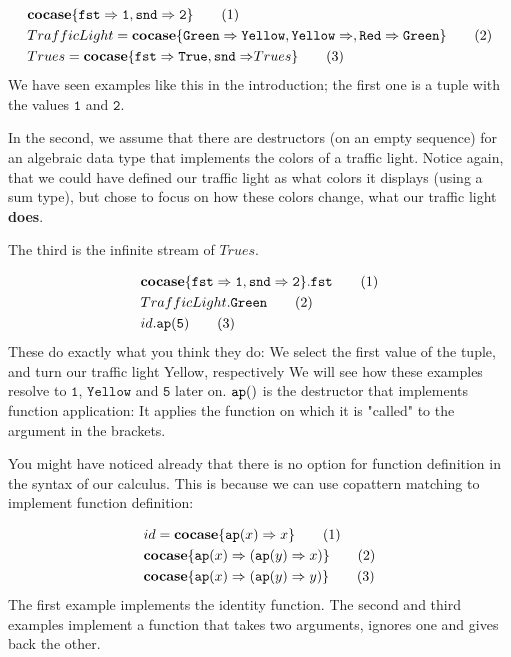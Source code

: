 \documentclass[twoside,12pt,a4paper]{article}
\begin{document}
\begin{example}
    \begin{align*}
        &\textbf{cocase}\{\mathtt{fst\Rightarrow 1, snd\Rightarrow 2}\}\tag{1}\\
        &TrafficLight = \textbf{cocase}\{\mathtt{Green \Rightarrow Yellow, Yellow\Rightarrow, Red\Rightarrow Green}\}\tag{2}\\
        &Trues = \textbf{cocase}\{\mathtt{fst \Rightarrow True, snd\Rightarrow}Trues\}\tag{3} 
    \end{align*}
    We have seen examples like this in the introduction; the first one is a tuple with the values $\mathtt{1}$ and $\mathtt{2}$.

    In the second, we assume that there are destructors (on an empty sequence) for an algebraic data type that implements the colors of a traffic light.
    Notice again, that we could have defined our traffic light as what colors it displays (using a sum type), but chose to focus on how these colors change, 
    what our traffic light \textbf{does}.

    The third is the infinite stream of $Trues$.
\end{example}

\begin{example}
    \begin{align*}
        &\textbf{cocase}\{\mathtt{fst\Rightarrow 1, snd\Rightarrow 2}\}.\mathtt{fst}\tag{1}\\
        &TrafficLight.\mathtt{Green}\tag{2}\\
        &id.\texttt{ap}(\mathtt{5})\tag{3}
    \end{align*}
    These do exactly what you think they do: We select the first value of the tuple,
    and turn our traffic light Yellow, respectively 
    We will see how these examples resolve to $\mathtt{1}$, $\mathtt{Yellow}$ and $\mathtt{5}$ later on. %
    $\texttt{ap}()$ is the destructor that implements function application: It applies the function on which it is "called" to the argument in the brackets.
\end{example} 

You might have noticed already that there is no option for function definition in the syntax of our calculus.
This is because we can use copattern matching to implement function definition:
\begin{example}
    \begin{align*}
        &id = \textbf{cocase}\{\texttt{ap}(x)\Rightarrow x\}\tag{1}\\
        &\textbf{cocase}\{\texttt{ap}(x)\Rightarrow (\texttt{ap}(y)\Rightarrow x)\} \tag{2} \\
        &\textbf{cocase}\{\texttt{ap}(x)\Rightarrow (\texttt{ap}(y)\Rightarrow y)\} \tag{3}
    \end{align*}
    The first example implements the identity function. The second and third examples implement a function that takes two arguments, ignores one and gives back the other.
\end{example}
\end{document}

